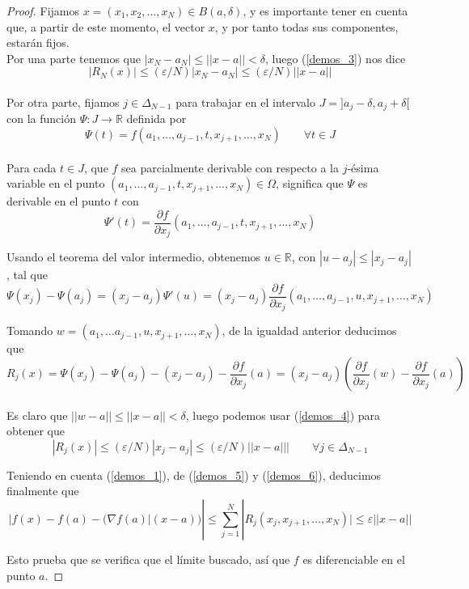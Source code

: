 \documentclass[a4paper, 12pt]{article}
\begin{document}
\begin{enumerate}[label=\textbf{\arabic*}.]
\begin{proof}
Fijamos \(x = (x_1, x_2, \dotsc, x_N) \in B(a, \delta)\), y es importante tener en cuenta que, a partir de este momento, el vector \(x\), y por tanto todas sus componentes, estarán fijos. \\

Por una parte tenemos que \(| x_N - a_N| \leq ||x-a|| < \delta\), luego (\ref{demos_3}) nos dice
\begin{equation}\label{demos_5}
	|R_N (x)| \leq (\varepsilon /N) |x_N - a_N| \leq (\varepsilon /N) ||x-a||
\end{equation} \\

Por otra parte, fijamos \(j \in \Delta_{N-1}\) para trabajar en el intervalo \(J = ]a_j - \delta, a_j + \delta[\) con la función \(\Psi: J \to \mathbb{R}\) definida por
\[
	\Psi (t) = f(a_1, \dotsc, a_{j-1}, t, x_{j+1}, \dotsc, x_N) \qquad \forall t \in J
\] \\

Para cada \(t \in J\), que \(f\) sea parcialmente derivable con respecto a la \(j\)-ésima variable en el punto \((a_1, \dotsc, a_{j-1},t , x_{j+1}, \dotsc, x_N) \in \Omega\), significa que \(\Psi\) es derivable en el punto \(t\) con 
\[
 \Psi'(t) = \frac{\partial f}{\partial x_j} (a_1, \dotsc, a_{j-1}, t, x_{j+1}, \dotsc, x_N)
\]

Usando el teorema del valor intermedio, obtenemos \(u \in \mathbb{R}\), con \(|u - a_j | \leq |x_j - a_j|\), tal que 
\[
	\Psi (x_j) - \Psi (a_j) = (x_j - a_j) \Psi ' (u) = (x_j - a_j) \frac{\partial f}{\partial x_j} (a_1, \dotsc, a_{j-1}, u, x_{j+1}, \dotsc, x_N)
\]

Tomando \(w = (a_1, \dotsc a_{j-1}, u, x_{j+1}, \dotsc, x_N)\), de la igualdad anterior deducimos que
\[
	R_j(x) = \Psi (x_j) - \Psi (a_j) - (x_j - a_j) - \frac{\partial f }{\partial x_j} (a) = (x_j - a_j) \left( \frac{\partial f}{\partial x_j} (w) - \frac{\partial f}{\partial x_j} (a) \right)
\] \\

Es claro que \(||w-a|| \leq ||x-a|| < \delta\), luego podemos usar (\ref{demos_4}) para obtener que
\begin{equation}\label{demos_6}
	|R_j(x)| \leq (\varepsilon / N) | x_j - a_j| \leq (\varepsilon /N) ||x-a||| \qquad \forall j \in \Delta_{N-1}
\end{equation}

Teniendo en cuenta (\ref{demos_1}), de (\ref{demos_5}) y (\ref{demos_6}), deducimos finalmente que
\[
	| f(x) - f(a) - (\nabla f(a) | (x-a)) | \leq \sum_{j=1}^{N} | R_j(x_j, x_{j+1}, \dotsc, x_N)| \leq \varepsilon ||x-a||
\]

Esto prueba que se verifica que el límite buscado, así que \(f\) es diferenciable en el punto \(a\).
\end{proof}
\end{enumerate}
\end{document}
